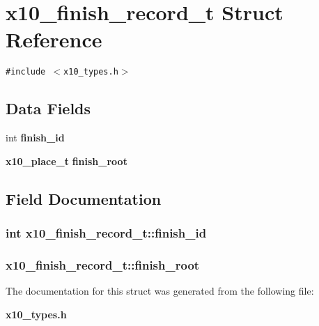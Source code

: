 \section{x10\_\-finish\_\-record\_\-t Struct Reference}
\label{structx10__finish__record__t}
{\tt \#include $<$x10\_\-types.h$>$}

\subsection*{Data Fields}
\begin{CompactItemize}
\item 
int {\bf finish\_\-id}
\item 
{\bf x10\_\-place\_\-t} {\bf finish\_\-root}
\end{CompactItemize}


\subsection{Field Documentation}
\subsubsection{\setlength{\rightskip}{0pt plus 5cm}int {\bf x10\_\-finish\_\-record\_\-t::finish\_\-id}}\label{structx10__finish__record__t_o0}


\subsubsection{ {\bf x10\_\-finish\_\-record\_\-t::finish\_\-root}}\label{structx10__finish__record__t_o1}




The documentation for this struct was generated from the following file:\begin{CompactItemize}
\item 
{\bf x10\_\-types.h}\end{CompactItemize}
